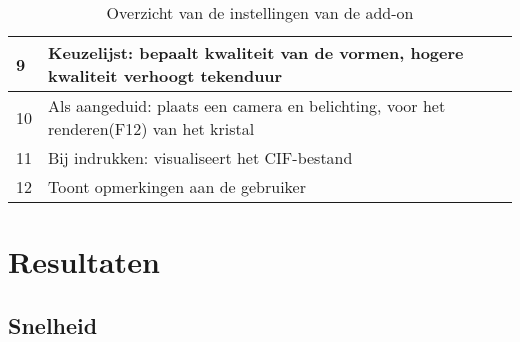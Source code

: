 \begin{table}[H]
\begin{tabular}{|l|l|}
9  & Keuzelijst: bepaalt kwaliteit van de vormen, hogere kwaliteit verhoogt tekenduur                                                                                                                                                                                     \\ \hline
10 & Als aangeduid: plaats een camera en belichting, voor het renderen(F12) van het kristal                                                                                                                                                                               \\ \hline
11 & Bij indrukken: visualiseert het CIF-bestand                                                                                                                                                                                                                          \\ \hline
12 & Toont opmerkingen aan de gebruiker                                                                                                                                                                                                                                   \\ \hline
\end{tabular}
\caption{Overzicht van de instellingen van de add-on}
\end{table}
  
\section{Resultaten}

\subsection{Snelheid}

